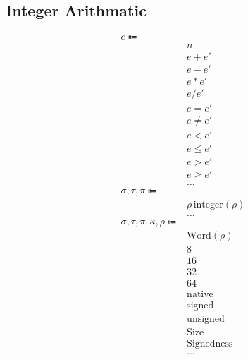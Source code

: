 \documentclass {article}
\begin{document}
\subsection{Integer Arithmatic}
\begin{align*}
e \Coloneqq & \\
& n \tag{Numeric Literal} \\
& e + e' \tag{Addition} \\
& e - e' \tag{Subtraction} \\
& e * e' \tag{Multiplication} \\
& e / e' \tag{Division} \\
& e = e' \tag {Equality} \\
& e \neq e' \tag {Inequality} \\
& e < e' \tag {Less Then} \\
& e \leq e' \tag {Less Then Equal} \\
& e > e' \tag {Greater Then} \\
& e \geq e' \tag {Greater Then Equal} \\
& \dots \\
\sigma, \tau, \pi \Coloneqq & \\
& \rho \, \text{integer}(\rho) \tag{Number} \\
& \dots \\
\sigma, \tau, \pi, \kappa, \rho \Coloneqq & \\
& \text{Word} (\rho) \tag{Word Representation} \\
& 8 \tag{Byte Size} \\
& 16 \tag{Short Size} \\
& 32 \tag{Int Size} \\
& 64 \tag{Long Size} \\
& \text{native} \tag{Native Size} \\
& \text{signed} \tag{Signed} \\
& \text{unsigned} \tag{Unsigned} \\
& \text{Size} \tag{Size Sort}\\
& \text{Signedness} \tag{Signedness Sort}\\
& \dots \\
\end{align*}
\end{document}
